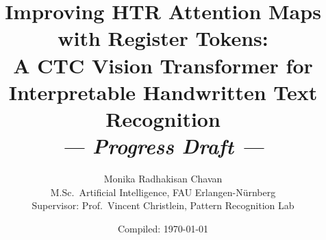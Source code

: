 \documentclass[11pt,a4paper]{article}
\title{\textbf{Improving HTR Attention Maps with Register Tokens:\\
A CTC Vision Transformer for Interpretable Handwritten Text Recognition}\\[0.4em]
\large\emph{--- Progress Draft ---}}
\author{Monika Radhakisan Chavan\\
M.Sc.\ Artificial Intelligence, FAU Erlangen-N\"urnberg\\
Supervisor: Prof.\ Vincent Christlein, Pattern Recognition Lab}
\date{Compiled: \today}
\begin{document}
\maketitle



\tableofcontents
\bigskip

















\end{document}
